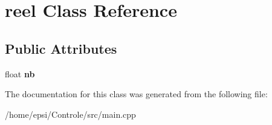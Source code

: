 \hypertarget{classreel}{}\section{reel Class Reference}
\label{classreel}
\subsection*{Public Attributes}
\begin{DoxyCompactItemize}
\item 
\mbox{\label{classreel_a7fe8ed1ff526ab4d6b8ac14c8d961729}} 
float {\bfseries nb}
\end{DoxyCompactItemize}


The documentation for this class was generated from the following file\+:\begin{DoxyCompactItemize}
\item 
/home/epsi/\+Controle/src/main.\+cpp\end{DoxyCompactItemize}
